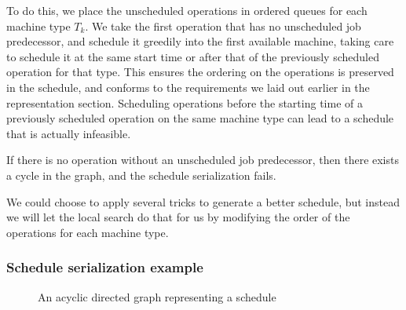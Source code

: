\documentclass[a4paper,10pt]{article}
\begin{document}
To do this, we place the unscheduled operations in ordered queues for each machine type $T_k$. We take the first operation that has no unscheduled job predecessor, and schedule it greedily into the first available machine, taking care to schedule it at the same start time or after that of the previously scheduled operation for that type. This ensures the ordering on the operations is preserved in the schedule, and conforms to the requirements we laid out earlier in the representation section. Scheduling operations before the starting time of a previously scheduled operation on the same machine type can lead to a schedule that is actually infeasible.

If there is no operation without an unscheduled job predecessor, then there exists a cycle in the graph, and the schedule serialization fails.

We could choose to apply several tricks to generate a better schedule, but instead we will let the local search do that for us by modifying the order of the operations for each machine type.

\subsubsection{Schedule serialization example}

\begin{figure}[h]
\centering
{}
\caption{An acyclic directed graph representing a schedule}
\label{fig:dag}
\end{figure}
\end{document}
